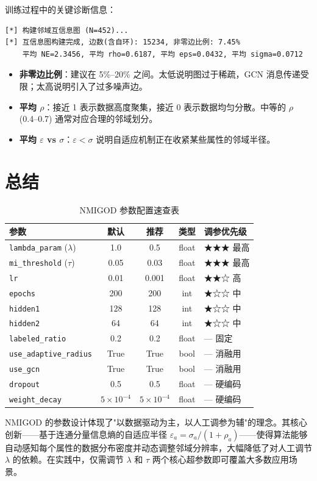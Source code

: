 \documentclass[11pt,a4paper]{ctexart}
\begin{document}
训练过程中的关键诊断信息：
\begin{verbatim}
[*] 构建邻域互信息图 (N=452)...
[*] 互信息图构建完成, 边数(含自环): 15234, 非零边比例: 7.45%
    平均 NE=2.3456, 平均 rho=0.6187, 平均 eps=0.0432, 平均 sigma=0.0712
\end{verbatim}

\begin{itemize}[leftmargin=*]
    \item \textbf{非零边比例}：建议在 5\%--20\% 之间。太低说明图过于稀疏，GCN 消息传递受限；太高说明引入了过多噪声边。
    \item \textbf{平均 $\rho$}：接近 1 表示数据高度聚集，接近 0 表示数据均匀分散。中等的 $\rho$ (0.4--0.7) 通常对应合理的邻域划分。
    \item \textbf{平均 $\varepsilon$ vs $\sigma$}：$\varepsilon < \sigma$ 说明自适应机制正在收紧某些属性的邻域半径。
\end{itemize}

\section{总结}

\begin{table}[H]\centering\caption{NMIGOD 参数配置速查表}\small
\begin{tabular}{lcccp{4cm}}
\toprule
参数 & 默认 & 推荐 & 类型 & 调参优先级 \\
\midrule
\texttt{lambda\_param} ($\lambda$) & 1.0 & 0.5 & float & ★★★ 最高 \\
\texttt{mi\_threshold} ($\tau$) & 0.05 & 0.03 & float & ★★★ 最高 \\
\texttt{lr} & 0.01 & 0.001 & float & ★★☆ 高 \\
\texttt{epochs} & 200 & 200 & int & ★☆☆ 中 \\
\texttt{hidden1} & 128 & 128 & int & ★☆☆ 中 \\
\texttt{hidden2} & 64 & 64 & int & ★☆☆ 中 \\
\texttt{labeled\_ratio} & 0.2 & 0.2 & float & --- 固定 \\
\texttt{use\_adaptive\_radius} & True & True & bool & --- 消融用 \\
\texttt{use\_gcn} & True & True & bool & --- 消融用 \\
\texttt{dropout} & 0.5 & 0.5 & float & --- 硬编码 \\
\texttt{weight\_decay} & $5\times 10^{-4}$ & $5\times 10^{-4}$ & float & --- 硬编码 \\
\bottomrule
\end{tabular}\end{table}

\vspace{6pt}
NMIGOD 的参数设计体现了"以数据驱动为主，以人工调参为辅"的理念。其核心创新——基于连通分量信息熵的自适应半径 $\varepsilon_a = \sigma_a / (1 + \rho_a)$——使得算法能够自动感知每个属性的数据分布密度并动态调整邻域分辨率，大幅降低了对人工调节 $\lambda$ 的依赖。在实践中，仅需调节 $\lambda$ 和 $\tau$ 两个核心超参数即可覆盖大多数应用场景。
\end{document}
